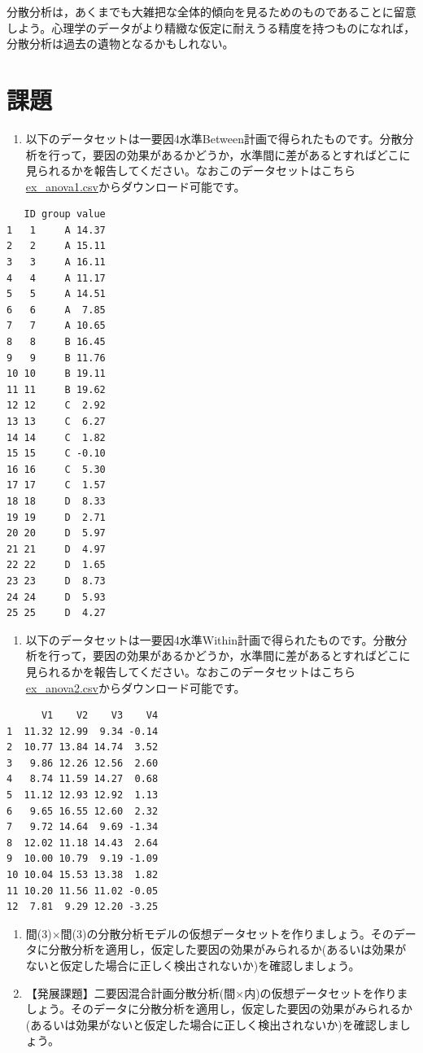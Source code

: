 \documentclass[
  a4paper,
]{ltjsbook}
\providecommand{\tightlist}{%
  \setlength{\itemsep}{0pt}\setlength{\parskip}{0pt}}
\begin{document}
分散分析は，あくまでも大雑把な全体的傾向を見るためのものであることに留意しよう。心理学のデータがより精緻な仮定に耐えうる精度を持つものになれば，分散分析は過去の遺物となるかもしれない。

\section{課題}\label{ux8ab2ux984c-7}

\begin{enumerate}
\def\labelenumi{\arabic{enumi}.}
\tightlist
\item
  以下のデータセットは一要因4水準Between計画で得られたものです。分散分析を行って，要因の効果があるかどうか，水準間に差があるとすればどこに見られるかを報告してください。なおこのデータセットはこちら\url{ex_anova1.csv}からダウンロード可能です。
\end{enumerate}

\begin{verbatim}
   ID group value
1   1     A 14.37
2   2     A 15.11
3   3     A 16.11
4   4     A 11.17
5   5     A 14.51
6   6     A  7.85
7   7     A 10.65
8   8     B 16.45
9   9     B 11.76
10 10     B 19.11
11 11     B 19.62
12 12     C  2.92
13 13     C  6.27
14 14     C  1.82
15 15     C -0.10
16 16     C  5.30
17 17     C  1.57
18 18     D  8.33
19 19     D  2.71
20 20     D  5.97
21 21     D  4.97
22 22     D  1.65
23 23     D  8.73
24 24     D  5.93
25 25     D  4.27
\end{verbatim}

\begin{enumerate}
\def\labelenumi{\arabic{enumi}.}
\setcounter{enumi}{1}
\tightlist
\item
  以下のデータセットは一要因4水準Within計画で得られたものです。分散分析を行って，要因の効果があるかどうか，水準間に差があるとすればどこに見られるかを報告してください。なおこのデータセットはこちら\url{ex_anova2.csv}からダウンロード可能です。
\end{enumerate}

\begin{verbatim}
      V1    V2    V3    V4
1  11.32 12.99  9.34 -0.14
2  10.77 13.84 14.74  3.52
3   9.86 12.26 12.56  2.60
4   8.74 11.59 14.27  0.68
5  11.12 12.93 12.92  1.13
6   9.65 16.55 12.60  2.32
7   9.72 14.64  9.69 -1.34
8  12.02 11.18 14.43  2.64
9  10.00 10.79  9.19 -1.09
10 10.04 15.53 13.38  1.82
11 10.20 11.56 11.02 -0.05
12  7.81  9.29 12.20 -3.25
\end{verbatim}

\begin{enumerate}
\def\labelenumi{\arabic{enumi}.}
\setcounter{enumi}{2}
\tightlist
\item
  間(3)\(\times\)間(3)の分散分析モデルの仮想データセットを作りましょう。そのデータに分散分析を適用し，仮定した要因の効果がみられるか(あるいは効果がないと仮定した場合に正しく検出されないか)を確認しましょう。
\item
  【発展課題】二要因混合計画分散分析(間\(\times\)内)の仮想データセットを作りましょう。そのデータに分散分析を適用し，仮定した要因の効果がみられるか(あるいは効果がないと仮定した場合に正しく検出されないか)を確認しましょう。
\end{enumerate}
\end{document}

